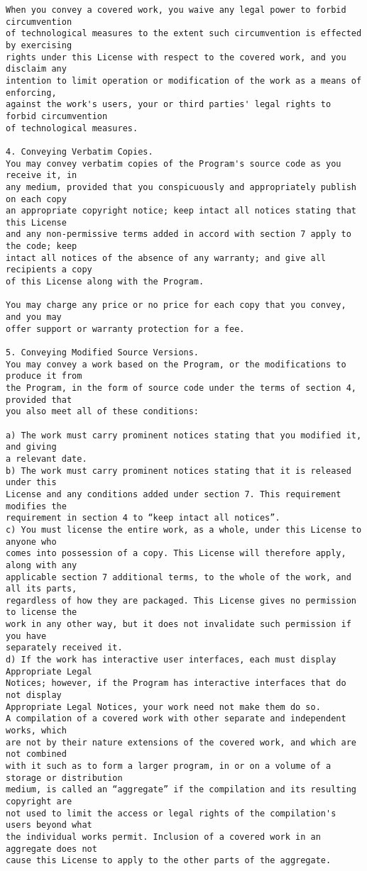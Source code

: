 \begin{verbatim}
When you convey a covered work, you waive any legal power to forbid circumvention
of technological measures to the extent such circumvention is effected by exercising
rights under this License with respect to the covered work, and you disclaim any
intention to limit operation or modification of the work as a means of enforcing,
against the work's users, your or third parties' legal rights to forbid circumvention
of technological measures.

4. Conveying Verbatim Copies.
You may convey verbatim copies of the Program's source code as you receive it, in
any medium, provided that you conspicuously and appropriately publish on each copy
an appropriate copyright notice; keep intact all notices stating that this License
and any non-permissive terms added in accord with section 7 apply to the code; keep
intact all notices of the absence of any warranty; and give all recipients a copy
of this License along with the Program.

You may charge any price or no price for each copy that you convey, and you may
offer support or warranty protection for a fee.

5. Conveying Modified Source Versions.
You may convey a work based on the Program, or the modifications to produce it from
the Program, in the form of source code under the terms of section 4, provided that
you also meet all of these conditions:

a) The work must carry prominent notices stating that you modified it, and giving
a relevant date.
b) The work must carry prominent notices stating that it is released under this
License and any conditions added under section 7. This requirement modifies the
requirement in section 4 to “keep intact all notices”.
c) You must license the entire work, as a whole, under this License to anyone who
comes into possession of a copy. This License will therefore apply, along with any
applicable section 7 additional terms, to the whole of the work, and all its parts,
regardless of how they are packaged. This License gives no permission to license the
work in any other way, but it does not invalidate such permission if you have
separately received it.
d) If the work has interactive user interfaces, each must display Appropriate Legal
Notices; however, if the Program has interactive interfaces that do not display
Appropriate Legal Notices, your work need not make them do so.
A compilation of a covered work with other separate and independent works, which
are not by their nature extensions of the covered work, and which are not combined
with it such as to form a larger program, in or on a volume of a storage or distribution
medium, is called an “aggregate” if the compilation and its resulting copyright are
not used to limit the access or legal rights of the compilation's users beyond what
the individual works permit. Inclusion of a covered work in an aggregate does not
cause this License to apply to the other parts of the aggregate.


\end{verbatim}
